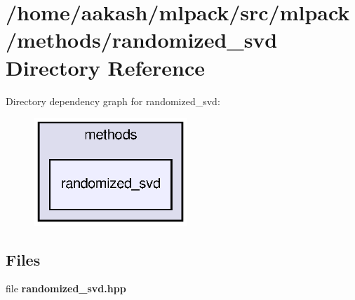 \section{/home/aakash/mlpack/src/mlpack/methods/randomized\+\_\+svd Directory Reference}
\label{dir_2fc1595eb878e336b6604e9b96f83670}
Directory dependency graph for randomized\+\_\+svd\+:
\nopagebreak
\begin{figure}[H]
\begin{center}
\leavevmode
\includegraphics[width=164pt]{dir_2fc1595eb878e336b6604e9b96f83670_dep}
\end{center}
\end{figure}
\subsection*{Files}
\begin{DoxyCompactItemize}
\item 
file \textbf{ randomized\+\_\+svd.\+hpp}
\end{DoxyCompactItemize}
